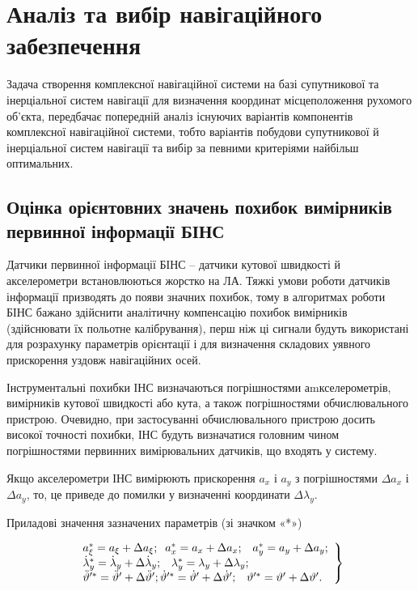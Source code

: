 \section{Аналіз та вибір навігаційного забезпечення}

Задача створення комплексної навігаційної системи на базі супутникової та інерціальної 
систем навігації для визначення координат місцеположення рухомого об'єкта, передбачає 
попередній аналіз існуючих варіантів компонентів комплексної навігаційної системи, тобто 
варіантів побудови супутникової й  інерціальної систем навігації та вибір за певними критеріями найбільш оптимальних. 

\subsection{Оцінка орієнтовних значень похибок вимірників первинної інформації БІНС }

Датчики первинної інформації БІНС -- датчики кутової швидкості й акселерометри встановлюються жорстко на ЛА. 
Тяжкі умови роботи датчиків інформації призводять до появи значних похибок, тому в алгоритмах роботи БІНС бажано 
здійснити аналітичну компенсацію похибок вимірників (здійснювати їх польотне калібрування), перш ніж ці сигнали 
будуть використані для розрахунку параметрів орієнтації і для визначення складових уявного прискорення уздовж навігаційних осей.

Інструментальні похибки ІНС визначаються погрішностями аmкселерометрів, вимірників кутової швидкості або кута, 
а також погрішностями обчислювального пристрою. Очевидно, при застосуванні обчислювального пристрою досить високої 
точності похибки, ІНС будуть визначатися головним чином погрішностями первинних вимірювальних датчиків, що входять у систему.

Якщо акселерометри ІНС вимірюють прискорення $a_{x} $ і $a_{y} $ з погрішностями $\Delta a_{x} $ і $\Delta a_{y} $, то,  
це приведе до помилки у визначенні координати $\Delta \lambda _{y} $.

Приладові значення зазначених параметрів (зі значком «*»)

\begin{equation} 
\label{eq:err} 
\left. 
\begin{array}{l} 
{a_{\xi }^{*} =a_{\xi } +\Delta a_{\xi } ;{\rm \; \; }a_{x}^{*} =a_{x} +\Delta a_{x} ;{\rm \; \; \; }a_{y}^{*} =a_{y} +\Delta a_{y} ;} 
\\ {\dot{\lambda }_{y}^{*} =\dot{\lambda }_{y} +\Delta \dot{\lambda }_{y} ;{\rm \; \; \; }\lambda _{y}^{*} =\lambda _{y} 
+\Delta \lambda _{y} ;{\rm \; \; \; }}
\\ {\ddot{\vartheta }'^{*} =\ddot{\vartheta }'+\Delta \ddot{\vartheta }'; \dot{\vartheta }'^{*} =\dot{\vartheta }'+\Delta \dot{\vartheta }';
{\rm \; \; \; }\vartheta '^{*} =\vartheta '+\Delta \vartheta '.} \end{array}\right\} 
\end{equation} 

